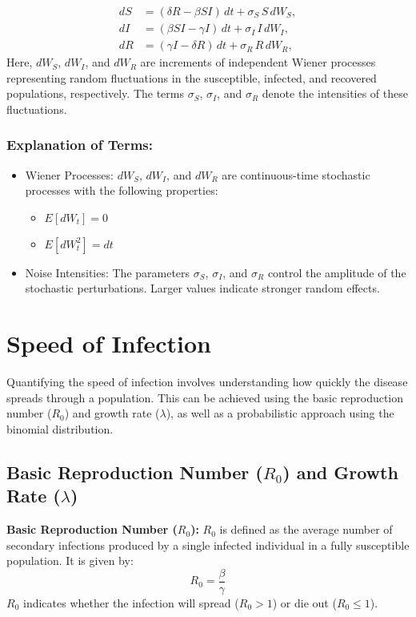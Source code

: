 \begin{align}
dS &= \left(\delta R - \beta SI\right) \, dt + \sigma_S \, S \, dW_S, \\
dI &= \left(\beta SI - \gamma I\right) \, dt + \sigma_I \, I \, dW_I, \\
dR &= \left(\gamma I - \delta R\right) \, dt + \sigma_R \, R \, dW_R,
\end{align}
\noindent
Here, \(dW_S\), \(dW_I\), and \(dW_R\) are increments of independent Wiener processes representing random fluctuations in the susceptible, infected, and recovered populations, respectively. The terms \(\sigma_S\), \(\sigma_I\), and \(\sigma_R\) denote the intensities of these fluctuations.

\subsubsection*{Explanation of Terms:}
\begin{itemize}
    \item Wiener Processes: \(dW_S\), \(dW_I\), and \(dW_R\) are continuous-time stochastic processes with the following properties:
    \begin{itemize}
        \item \(E[dW_t] = 0\)
        \item \(E[dW_t^2] = dt\)
    \end{itemize}
    \item Noise Intensities: The parameters \(\sigma_S\), \(\sigma_I\), and \(\sigma_R\) control the amplitude of the stochastic perturbations. Larger values indicate stronger random effects.
\end{itemize}

\section{Speed of Infection}
Quantifying the speed of infection involves understanding how quickly the disease spreads through a population. This can be achieved using the basic reproduction number ($R_0$) and growth rate ($\lambda$), as well as a probabilistic approach using the binomial distribution.

\subsection{Basic Reproduction Number ($R_0$) and Growth Rate ($\lambda$)}
\textbf{Basic Reproduction Number ($R_0$):} $R_0$ is defined as the average number of secondary infections produced by a single infected individual in a fully susceptible population. It is given by:
\begin{equation}
R_0 = \frac{\beta}{\gamma}
\end{equation}
$R_0$ indicates whether the infection will spread ($R_0 > 1$) or die out ($R_0 \leq 1$).\\

